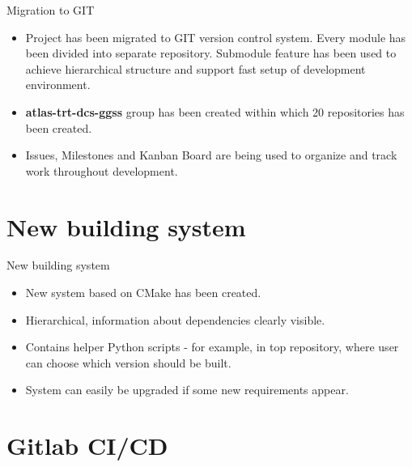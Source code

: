 \documentclass[10pt]{beamer}
\begin{document}
\begin{frame}{Migration to GIT}
\begin{itemize}
	\item Project has been migrated to GIT version control system. Every module has been divided into separate repository. Submodule feature has been used to achieve hierarchical structure and support fast setup of development environment.
	\item \textbf{atlas-trt-dcs-ggss} group has been created within which 20 repositories has been created. 
	\item Issues, Milestones and Kanban Board are being used to organize and track work throughout development.
\end{itemize}
\end{frame}


\section {New building system}

\begin{frame}{New building system}
\begin{itemize}
  \item New system based on CMake has been created.
  \item Hierarchical, information about dependencies clearly visible.
  \item Contains helper Python scripts - for example, in top repository, where user can choose which version should be built.
  \item System can easily be upgraded if some new requirements appear.
\end{itemize}
\end{frame}


\section {Gitlab CI/CD}
\end{document}
